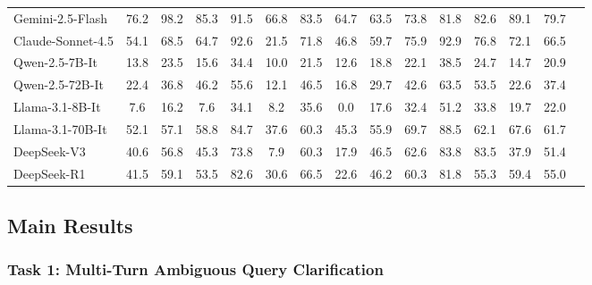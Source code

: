 \documentclass[sigconf]{acmart}
\begin{document}
\begin{table}[!t]
\begin{adjustbox}{width=0.95\linewidth}
\begin{tabular}{lcccccccccccccc}
Gemini-2.5-Flash & \cellcolor{green!20}76.2 & \cellcolor{green!20}98.2 & \cellcolor{green!20}85.3 & 91.5 & \cellcolor{green!20}66.8 & \cellcolor{green!20}83.5 & \cellcolor{green!20}64.7 & \cellcolor{green!20}63.5 & 73.8 & 81.8 & 82.6 & \cellcolor{green!20}89.1 & \cellcolor{green!20}79.7 \\

Claude-Sonnet-4.5 & 54.1 & 68.5 & 64.7 & \cellcolor{green!20}92.6 & 21.5 & 71.8 & 46.8 & 59.7 & \cellcolor{green!20}75.9 & 92.9 & 76.8 & 72.1 & 66.5 \\


Qwen-2.5-7B-It & 13.8 & 23.5 & 15.6 & 34.4 & 10.0 & \cellcolor{red!20}21.5 & 12.6 & 18.8 & \cellcolor{red!20}22.1 & \cellcolor{red!20}38.5 & \cellcolor{red!20}24.7 & \cellcolor{red!20}14.7 & \cellcolor{red!20}20.9 \\
Qwen-2.5-72B-It & 22.4 & 36.8 & 46.2 & 55.6 & 12.1 & 46.5 & 16.8 & 29.7 & 42.6 & 63.5 & 53.5 & 22.6 & 37.4 \\
Llama-3.1-8B-It & \cellcolor{red!20}7.6 & \cellcolor{red!20}16.2 & \cellcolor{red!20}7.6 & \cellcolor{red!20}34.1 & 8.2 & 35.6 & \cellcolor{red!20}0.0 & \cellcolor{red!20}17.6 & 32.4 & 51.2 & 33.8 & 19.7 & 22.0 \\
Llama-3.1-70B-It & 52.1 & 57.1 & 58.8 & 84.7 & 37.6 & 60.3 & 45.3 & 55.9 & 69.7 & 88.5 & 62.1 & 67.6 & 61.7 \\

DeepSeek-V3 & 40.6 & 56.8 & 45.3 & 73.8 & 7.9 & 60.3 & 17.9 & 46.5 & 62.6 & 83.8 & \cellcolor{green!20}83.5 & 37.9 & 51.4 \\
DeepSeek-R1 & 41.5 & 59.1 & 53.5 & 82.6 & 30.6 & 66.5 & 22.6 & 46.2 & 60.3 & 81.8 & 55.3 & 59.4 & 55.0 \\

\bottomrule
\end{tabular}
\end{adjustbox}
\end{table}






\vspace{-0.1in}
\subsection{Main Results}

\subsubsection{Task 1: Multi-Turn Ambiguous Query Clarification}
\label{sec:5.2.1}
\end{document}
